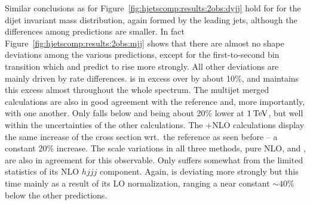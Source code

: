 Similar conclusions as for Figure~\ref{fig:hjetscomp:results:2obs:dyjj} 
hold for for the dijet invariant mass distribution, again formed by the 
leading jets, although the differences among predictions are smaller.
In fact Figure~\ref{fig:hjetscomp:results:2obs:mjj} shows that there
are almost no shape deviations among the various predictions, except
for the first-to-second bin transition which \Powheg and \MGaMC
predict to rise more strongly. All other deviations are mainly driven
by rate differences. \Sherpa \NNLOPS is in excess over \Powheg \NNLOPS
by about 10\%, and maintains this excess almost throughout the whole
spectrum. The multijet merged calculations are also in good agreement
with the \Powheg reference and, more importantly, with one another. Only
\MGaMC falls below \Herwig and \Sherpa \MEPSatNLO being about 20\%
lower at $1\text{\:TeV}$, but well within the uncertainties of the other
calculations. The \GoSam{}+\Sherpa NLO calculations display the same
increase of the cross section wrt.~the reference as seen before -- a
constant 20\% increase. The scale variations in all three methods,
pure NLO, \Minlo and \Loopsim, are also in agreement for this
observable. Only \Loopsim suffers somewhat from the limited statistics
of its NLO $hjjj$ component. Again, \Hej is deviating more strongly
but this time mainly as a result of its LO normalization, ranging a
near constant $\sim 40\%$ below the other predictions.

